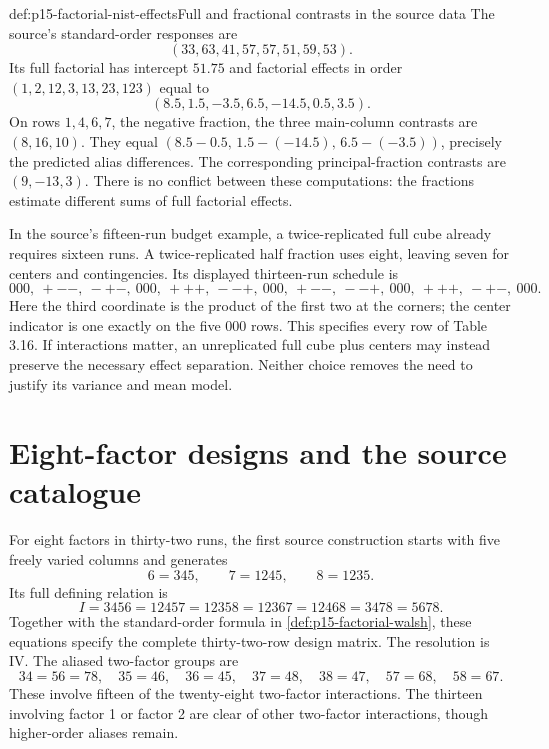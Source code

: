 \begin{hbexample}{def:p15-factorial-nist-effects}{Full and fractional contrasts in the source data}
The source's standard-order responses are
\[
 (33,63,41,57,57,51,59,53).
\]
Its full factorial has intercept \(51.75\) and factorial effects in order
\((1,2,12,3,13,23,123)\) equal to
\[
 (8.5,1.5,-3.5,6.5,-14.5,0.5,3.5).
\]
On rows \(1,4,6,7\), the negative fraction, the three main-column
contrasts are \((8,16,10)\). They equal
\((8.5-0.5,\,1.5-(-14.5),\,6.5-(-3.5))\), precisely the predicted
alias differences. The corresponding principal-fraction contrasts are
\((9,-13,3)\). There is no conflict between these computations: the
fractions estimate different sums of full factorial effects.
\end{hbexample}

In the source's fifteen-run budget example, a twice-replicated full cube
already requires sixteen runs. A twice-replicated half fraction uses eight,
leaving seven for centers and contingencies. Its displayed thirteen-run
schedule is
\[
 000,\ +--,\ -+-,\ 000,\ +++,\ --+,\ 000,\ +--,
 \ --+,\ 000,\ +++,\ -+-,\ 000.
\]
Here the third coordinate is the product of the first two at the corners;
the center indicator is one exactly on the five \(000\) rows. This
specifies every row of Table 3.16. If interactions matter, an unreplicated
full cube plus centers may instead preserve the necessary effect separation.
Neither choice removes the need to justify its variance and mean model.

\section{Eight-factor designs and the source catalogue}
\label{sec:p15-factorial-eight}

For eight factors in thirty-two runs, the first source construction starts
with five freely varied columns and generates
\[
 6=345,\qquad7=1245,\qquad8=1235.
\]
Its full defining relation is
\[
 I=3456=12457=12358=12367=12468=3478=5678.
\]
Together with the standard-order formula in
\cref{def:p15-factorial-walsh}, these equations specify the complete
thirty-two-row design matrix. The resolution is IV. The aliased two-factor
groups are
\[
 34=56=78,\quad35=46,\quad36=45,\quad37=48,
 \quad38=47,\quad57=68,\quad58=67.
\]
These involve fifteen of the twenty-eight two-factor interactions.
The thirteen involving factor 1 or factor 2 are clear of other two-factor
interactions, though higher-order aliases remain.

